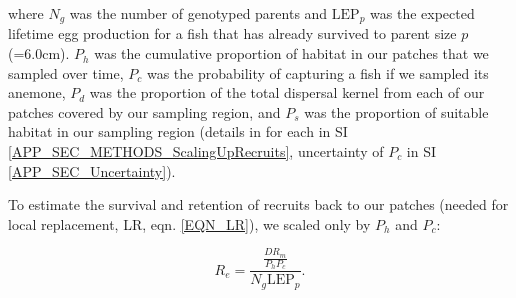 \documentclass[12pt, oneside]{article}   	%
\begin{document}
where $N_g$ was the number of genotyped parents and $\text{LEP}_p$ was the expected lifetime egg production for a fish that has already survived to parent size $p$ (=6.0cm). $P_h$ was the cumulative proportion of habitat in our patches that we sampled over time, $P_c$ was the probability of capturing a fish if we sampled its anemone, $P_d$ was the proportion of the total dispersal kernel from each of our patches covered by our sampling region, and $P_s$ was the proportion of suitable habitat in our sampling region (details in for each in SI \ref{APP_SEC_METHODS_ScalingUpRecruits}, uncertainty of $P_c$ in SI \ref{APP_SEC_Uncertainty}).

To estimate the survival and retention of recruits back to our patches (needed for local replacement, LR, eqn. \ref{EQN_LR}), we scaled only by $P_h$ and $P_c$: 

\begin{equation}
R_e = \frac{\frac{D R_m}{P_h P_c}}{N_g \text{LEP}_p}. \label{EQN_Re}
\end{equation}

\end{document}
